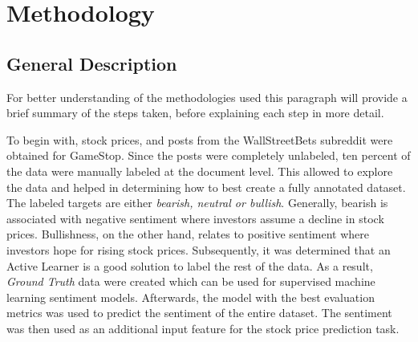 \documentclass[11pt, a4paper]{article}
\begin{document}


\section{Methodology}

\subsection{General Description} \label{general_description}

For better understanding of the methodologies used this paragraph will provide a brief summary of the steps taken, before
explaining each step in more detail.

To begin with, stock prices, and posts from the WallStreetBets subreddit were obtained for GameStop. Since the posts were completely
unlabeled, ten percent of the data were manually labeled at the document level. This allowed to explore the data and helped in determining how to best create a fully annotated dataset.
The labeled targets are either \emph{bearish, neutral or bullish}. Generally, bearish is associated with negative 
sentiment where investors assume a decline in stock prices. Bullishness, on the other hand, relates to positive sentiment where investors hope for rising stock prices.
Subsequently, it was determined that an Active Learner is a good solution to label the rest of the data. As a result, \emph{Ground Truth} data were created which can be used
for supervised machine learning sentiment models. Afterwards, the model with the best evaluation metrics was used to predict the sentiment of the entire
dataset. The sentiment was then used as an additional input feature for the stock price prediction task.
\end{document}
